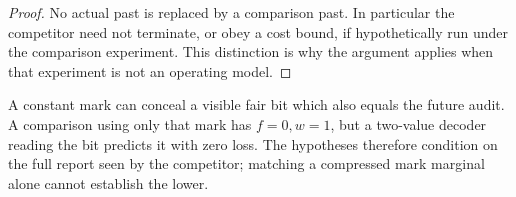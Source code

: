 \begin{proof}
No actual past is replaced by a comparison past. In particular the competitor need not terminate, or obey a cost bound, if hypothetically run under the comparison experiment. This distinction is why the argument applies when that experiment is not an operating model.
\end{proof}

\begin{remark}
A constant mark can conceal a visible fair bit which also equals the future audit. A comparison using only that mark has $f=0,w=1$, but a two-value decoder reading the bit predicts it with zero loss. The hypotheses therefore condition on the full report seen by the competitor; matching a compressed mark marginal alone cannot establish the lower.
\end{remark}

